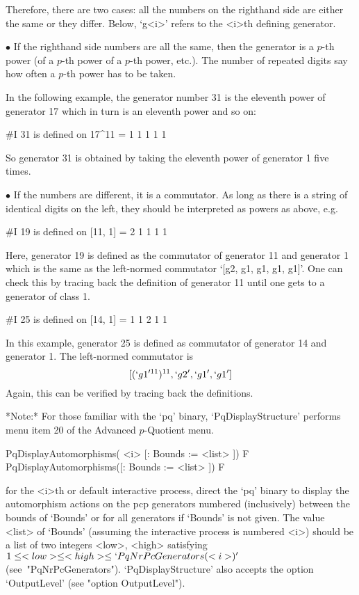 Therefore, there are two cases: all the numbers on the righthand side are
either the same or  they  differ.  Below,  `g<i>'  refers  to  the  <i>th
defining generator.

\beginlist%

\item{$\bullet$}
If the righthand side numbers are all the same, then the generator  is  a
$p$-th power (of a $p$-th power of a $p$-th power, etc.). The  number  of
repeated digits say how often a $p$-th power has to be taken.

In the following example, the generator number 31 is the  eleventh  power
of generator 17 which in turn is an eleventh power and so on:

\begintt
#I  31 is defined on 17^11 = 1 1 1 1 1 
\endtt
                    
So generator 31 is obtained by taking the eleventh power of  generator  1
five times.

\item{$\bullet$}
If the numbers are different, it is a commutator. As long as there  is  a
string of identical digits on the left, they  should  be  interpreted  as
powers as above, e.g.

\begintt
#I  19 is defined on [11, 1] = 2 1 1 1 1    
\endtt
        
Here, generator 19 is defined as  the  commutator  of  generator  11  and
generator  1  which  is  the   same   as   the   left-normed   commutator
`[g2, g1, g1, g1, g1]'. One can check this by tracing back the definition
of generator 11 until one gets to a generator of class 1.

\begintt
#I  25 is defined on [14, 1] = 1 1 2 1 1 
\endtt

In this example, generator 25 is defined as commutator  of  generator  14
and generator 1. The left-normed commutator is
$$
[(`g1'^{11})^{11}, `g2', `g1', `g1']
$$
Again, this can be verified by tracing back the definitions.

\endlist

*Note:*
For those familiar with the `pq'  binary,  `PqDisplayStructure'  performs
menu item 20 of the Advanced $p$-Quotient menu.

\>PqDisplayAutomorphisms( <i> [: Bounds := <list> ]) F
\>PqDisplayAutomorphisms([: Bounds := <list> ]) F

for the <i>th or default interactive {\ANUPQ} process,  direct  the  `pq'
binary to display the automorphism actions on the pcp generators numbered
(inclusively) between the bounds of `Bounds' or  for  all  generators  if
`Bounds' is not  given.  The  value  <list>  of  `Bounds'  (assuming  the
interactive process is numbered <i>) should be a  list  of  two  integers
<low>,   <high>   satisfying   $1    \le    <low>    \le    <high>    \le
`PqNrPcGenerators(<i>)'$  (see~"PqNrPcGenerators").  `PqDisplayStructure'
also accepts the option `OutputLevel' (see "option OutputLevel").


